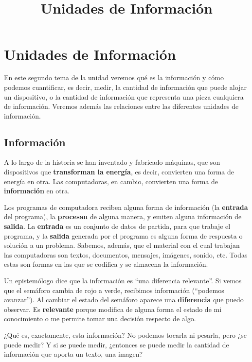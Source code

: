 \documentclass[spanish,a4paper,]{article}
\title{Unidades de Información}
\date{}
\begin{document}
\maketitle

\hypertarget{unidades-de-informaciuxf3n}{%
\section{Unidades de Información}\label{unidades-de-informaciuxf3n}}

En este segundo tema de la unidad veremos qué es la información y cómo
podemos cuantificar, es decir, medir, la cantidad de información que
puede alojar un dispositivo, o la cantidad de información que representa
una pieza cualquiera de información. Veremos además las relaciones entre
las diferentes unidades de información.

\hypertarget{informaciuxf3n}{%
\subsection{Información}\label{informaciuxf3n}}

A lo largo de la historia se han inventado y fabricado máquinas, que son
dispositivos que \textbf{transforman la energía}, es decir, convierten
una forma de energía en otra. Las computadoras, en cambio, convierten
una forma de \textbf{información} en otra.

Los programas de computadora reciben alguna forma de información (la
\textbf{entrada} del programa), la \textbf{procesan} de alguna manera, y
emiten alguna información de \textbf{salida}. La \textbf{entrada} es un
conjunto de datos de partida, para que trabaje el programa, y la
\textbf{salida} generada por el programa es alguna forma de respuesta o
solución a un problema. Sabemos, además, que el material con el cual
trabajan las computadoras son textos, documentos, mensajes, imágenes,
sonido, etc. Todas estas son formas en las que se codifica y se almacena
la información.

Un epistemólogo dice que la información es ``una diferencia relevante''.
Si vemos que el semáforo cambia de rojo a verde, recibimos información
(``podemos avanzar''). Al cambiar el estado del semáforo aparece una
\textbf{diferencia} que puedo observar. Es \textbf{relevante} porque
modifica de alguna forma el estado de mi conocimiento o me permite tomar
una decisión respecto de algo.

¿Qué es, exactamente, esta información? No podemos tocarla ni pesarla,
pero ¿se puede medir? Y si se puede medir, ¿entonces se puede medir la
cantidad de información que aporta un texto, una imagen?
\end{document}
